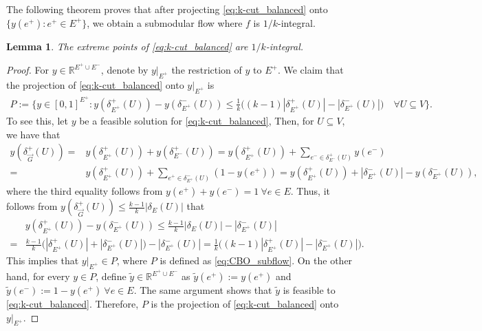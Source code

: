 \documentclass[11pt]{article}
\newtheorem{lemma}[theorem]{Lemma}
\newcommand{\R}{\mathbb{R}}
\begin{document}
The following theorem proves that after projecting \eqref{eq:k-cut_balanced} onto $\{y(e^+): e^+\in E^+\}$, we obtain a submodular flow where $f$ is $1/k$-integral.
\begin{lemma}\label{lemma:1/k-integral}
    The extreme points of \eqref{eq:k-cut_balanced} are $1/k$-integral.
\end{lemma}
\begin{proof}
    For $y\in \R^{E^+\cup E^-}$, denote by $y|_{E^+}$ the restriction of $y$ to $E^+$. We claim that the projection of \eqref{eq:k-cut_balanced} onto $y|_{E^+}$ is
    \begin{equation}\label{eq:CBO_subflow}
\begin{aligned}
    P:=\Big\{y\in[0,1]^{E^+}:y(\delta_{E^+}^+(U))-y(\delta_{E^+}^-(U))\leq \frac{1}{k}\Big((k-1)|\delta_{E^+}^+(U)|-|\delta_{E^+}^-(U)|\Big)\quad \forall U\subseteq V\Big\}.
\end{aligned}
\end{equation}
To see this, let $y$ be a feasible solution for \eqref{eq:k-cut_balanced},  
Then, for $U\subseteq V$, we have that
    \[
    \begin{aligned}
        y(\delta^+_{\vec{G}}(U))=&y(\delta^+_{E^+}(U))+y(\delta^+_{E^-}(U))=y(\delta^+_{E^+}(U))+\sum_{e^-\in \delta^+_{E^-}(U)} y(e^-)\\
        =&y(\delta^+_{E^+}(U))+\sum_{e^+\in \delta^-_{E^+}(U)} (1-y(e^+))
        =y(\delta^+_{E^+}(U))+|\delta^-_{E^+}(U)|-y(\delta^-_{E^+}(U)),
    \end{aligned}
    \]
    where the third equality follows from $y(e^+)+y(e^-)=1\ \forall e\in E$. Thus, it follows from $y(\delta_{\vec{G}}^+(U))\leq \frac{k-1}{k}|\delta_E(U)|$ that
    \[
    \begin{aligned}
        &y(\delta^+_{E^+}(U))-y(\delta^-_{E^+}(U))\leq \frac{k-1}{k}|\delta_E(U)|-|\delta^-_{E^+}(U)|\\
        =&\frac{k-1}{k}\Big(|\delta_{E^+}^+(U)|+|\delta_{E^+}^-(U)|\Big)-|\delta^-_{E^+}(U)|
        =\frac{1}{k}\Big((k-1)|\delta_{E^+}^+(U)|-|\delta_{E^+}^-(U)|\Big).
    \end{aligned}
    \]
This implies that $y|_{E^+}\in P$, where $P$ is defined as \eqref{eq:CBO_subflow}. On the other hand, for every $y\in P$, define $\tilde{y}\in \R^{E^+\cup E^-}$ as $\tilde{y}(e^+):=y(e^+)$ and $\tilde{y}(e^-):=1-y(e^+)\ \forall e\in E$. The same argument shows that $\tilde{y}$ is feasible to \eqref{eq:k-cut_balanced}. Therefore, $P$ is the projection of \eqref{eq:k-cut_balanced} onto $y|_{E^+}$.
    

\end{proof}
\end{document}
